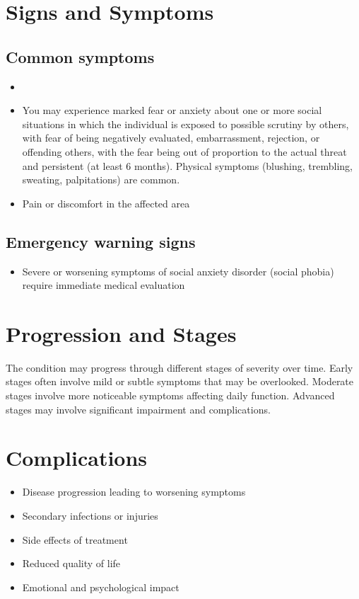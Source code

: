 \section{Signs and Symptoms}
\subsection{Common symptoms}
\begin{itemize}[noitemsep]
  \item \item You may experience marked fear or anxiety about one or more social situations in which the individual is exposed to possible scrutiny by others, with fear of being negatively evaluated, embarrassment, rejection, or offending others, with the fear being out of proportion to the actual threat and persistent (at least 6 months). Physical symptoms (blushing, trembling, sweating, palpitations) are common.
  \item Pain or discomfort in the affected area
  \end{itemize}
\subsection{Emergency warning signs}
\begin{itemize}[noitemsep]
  \item Severe or worsening symptoms of social anxiety disorder (social phobia) require immediate medical evaluation
\end{itemize}
\section{Progression and Stages}
The condition may progress through different stages of severity over time. Early stages often involve mild or subtle symptoms that may be overlooked. Moderate stages involve more noticeable symptoms affecting daily function. Advanced stages may involve significant impairment and complications.
\section{Complications}
\begin{itemize}[noitemsep]
  \item Disease progression leading to worsening symptoms
  \item Secondary infections or injuries
  \item Side effects of treatment
  \item Reduced quality of life
  \item Emotional and psychological impact
\end{itemize}
